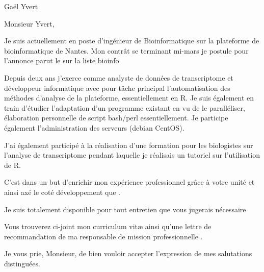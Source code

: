 \documentclass[11pt]{lettre}
\date{1 décembre 2011}
\makeatletter
\newcommand*{\NoRule}{\renewcommand*{\rule@length}{0}}
\makeatother
\begin{document}
\begin{letter}{Gaël Yvert}
\NoRule
	\opening{Monsieur Yvert,}

			Je suis actuellement en poste d'ingénieur de Bioinformatique sur la plateforme de bioinformatique de Nantes. Mon contrât se terminant mi-mars je postule pour l'annonce parut le sur la liste bioinfo 
		 
	Depuis deux ans j'exerce comme analyste de données de transcriptome et développeur informatique avec pour tâche principal l'automatisation des méthodes d'analyse de la plateforme, essentiellement en R. Je suis également en train d'étudier l'adaptation d'un programme existant en vu de le paralléliser, élaboration personnelle de script bash/perl essentiellement. Je participe également l'administration des serveurs (debian CentOS). 
	
	 J'ai également participé à la réalisation d'une formation pour les biologistes sur l'analyse de transcriptome pendant laquelle je réalisais un tutoriel sur l'utilisation de R.
	  
	 		 

	C'est dans un but d'enrichir mon expérience professionnel grâce à votre unité et ainsi axé le coté développement que .			

				 Je suis totalement disponible pour tout entretien que vous jugerais nécessaire

				 Vous trouverez ci-joint mon curriculum vit\ae{} ainsi qu'une lettre de recommandation de ma responsable de mission professionnelle .



	\closing{Je vous prie, Monsieur, de bien vouloir accepter
	l'expression de mes salutations distinguées.} 
\end{letter}
\end{document}
